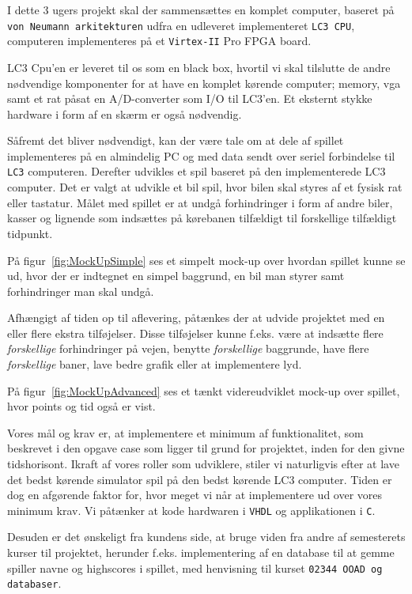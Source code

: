I dette 3 ugers projekt skal der sammensættes en komplet computer, baseret på \texttt{von Neumann arkitekturen} udfra en udleveret implementeret \texttt{LC3 CPU}, computeren implementeres på et \texttt{Virtex-II} Pro FPGA board.

LC3 Cpu’en er leveret til os som en black box, hvortil vi skal tilslutte de andre nødvendige komponenter for at have en komplet kørende computer; memory, vga samt et rat påsat en A/D-converter som I/O til LC3’en. Et eksternt stykke hardware i form af en skærm er også nødvendig.

Såfremt det bliver nødvendigt, kan der være tale om at dele af spillet implementeres på en almindelig PC og med data sendt over seriel forbindelse til \texttt{LC3} computeren. 
Derefter udvikles et spil baseret på den implementerede LC3 computer. Det er valgt at udvikle et bil spil, hvor bilen skal styres af et fysisk rat eller tastatur. Målet med spillet er at undgå forhindringer i form af andre biler, kasser og lignende som indsættes på kørebanen tilfældigt til forskellige tilfældigt tidpunkt.

På figur~\vref{fig:MockUpSimple} ses et simpelt mock-up over hvordan spillet kunne se ud, hvor der er indtegnet en simpel baggrund, en bil man styrer samt forhindringer man skal undgå.


Afhængigt af tiden op til aflevering, påtænkes der at udvide projektet med en eller flere ekstra tilføjelser. Disse tilføjelser kunne f.eks. være at indsætte flere \textit{forskellige} forhindringer på vejen, benytte \textit{forskellige} baggrunde, have flere \textit{forskellige} baner, lave bedre grafik eller at implementere lyd.

På figur~\vref{fig:MockUpAdvanced} ses et tænkt videreudviklet mock-up over spillet, hvor points og tid også er vist.


Vores mål og krav er, at implementere et minimum af funktionalitet, som beskrevet i den opgave case som ligger til grund for projektet, inden for den givne tidshorisont. Ikraft af vores roller som udviklere, stiler vi naturligvis efter at lave det bedst kørende simulator spil på den bedst kørende LC3 computer. Tiden er dog en afgørende faktor for, hvor meget vi når at implementere ud over vores minimum krav.
Vi påtænker at kode hardwaren i \texttt{VHDL} og applikationen i \texttt{C}.

Desuden er det ønskeligt fra kundens side, at bruge viden fra andre af semesterets kurser til projektet, herunder f.eks. implementering af en database til at gemme spiller navne og highscores i spillet, med henvisning til kurset \texttt{02344 OOAD og databaser}.

